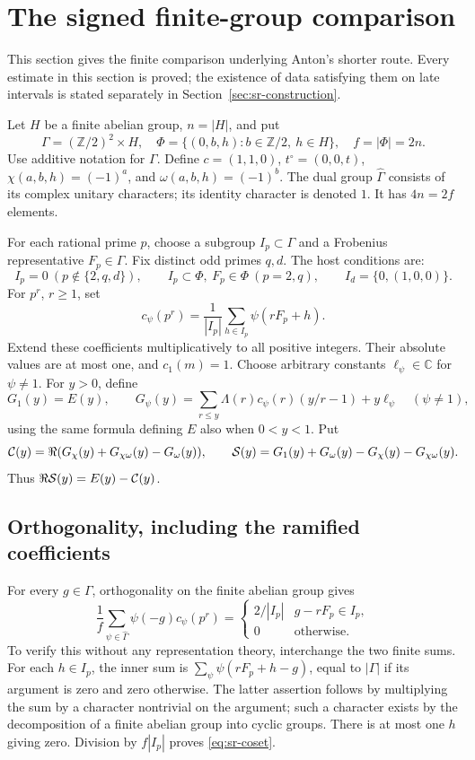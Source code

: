 \section{The signed finite-group comparison}\label{sec:sr-finite}
This section gives the finite comparison underlying Anton's shorter route.
Every estimate in this section is proved; the existence of data satisfying
them on late intervals is stated separately in
Section~\ref{sec:sr-construction}.

Let \(H\) be a finite abelian group, \(n=|H|\), and put
\[
 \Gamma=(\mathbb Z/2)^2\times H,\quad
 \Phi=\{(0,b,h):b\in\mathbb Z/2,\ h\in H\},\quad f=|\Phi|=2n.
\]
Use additive notation for \(\Gamma\). Define
\(c=(1,1,0)\), \(t^\circ=(0,0,t)\),
\(\chi(a,b,h)=(-1)^a\), and \(\omega(a,b,h)=(-1)^b\).
The dual group \(\widehat\Gamma\) consists of its complex unitary characters;
its identity character is denoted \(1\). It has \(4n=2f\) elements.

For each rational prime \(p\), choose a subgroup \(I_p\subset\Gamma\) and
a Frobenius representative \(F_p\in\Gamma\).
Fix distinct odd primes \(q,d\). The host conditions are:
\[
 I_p=0\ (p\notin\{2,q,d\}),\qquad
 I_p\subset\Phi,\ F_p\in\Phi\ (p=2,q),\qquad
 I_d=\{0,(1,0,0)\}.
\]
For \(p^r\), \(r\geq1\), set
\[
 c_\psi(p^r)=\frac1{|I_p|}\sum_{h\in I_p}\psi(rF_p+h).
\]
Extend these coefficients multiplicatively to all positive integers.
Their absolute values are at most one, and \(c_1(m)=1\).
Choose arbitrary constants \(\ell_\psi\in\mathbb C\) for \(\psi\ne1\).
For \(y>0\), define
\[
 G_1(y)=E(y),\qquad
 G_\psi(y)=\sum_{r\leq y}\Lambda(r)c_\psi(r)(y/r-1)+y\ell_\psi
 \quad(\psi\ne1),
\]
using the same formula defining \(E\) also when \(0<y<1\).
Put
\[
 {\cal C}(y)=\Re(G_\chi(y)+G_{\chi\omega}(y)-G_\omega(y)),
 \qquad {\cal S}(y)=G_1(y)+G_\omega(y)-G_\chi(y)-G_{\chi\omega}(y).
\]
Thus \(\Re{\cal S}(y)=E(y)-{\cal C}(y)\).

\subsection{Orthogonality, including the ramified coefficients}
For every \(g\in\Gamma\), orthogonality on the finite abelian group gives
\begin{equation}\label{eq:sr-coset}
 \frac1f\sum_{\psi\in\widehat\Gamma}\psi(-g)c_\psi(p^r)
 =\begin{cases}2/|I_p|&g-rF_p\in I_p,\\0&\text{otherwise}.\end{cases}
\end{equation}
To verify this without any representation theory, interchange the
two finite sums. For each \(h\in I_p\), the inner sum is
\(\sum_\psi\psi(rF_p+h-g)\), equal to \(|\Gamma|\) if its argument is zero
and zero otherwise. The latter assertion follows by multiplying the sum
by a character nontrivial on the argument; such a character exists by
the decomposition of a finite abelian group into cyclic groups.
There is at most one \(h\) giving zero. Division by \(f|I_p|\) proves
\eqref{eq:sr-coset}.

